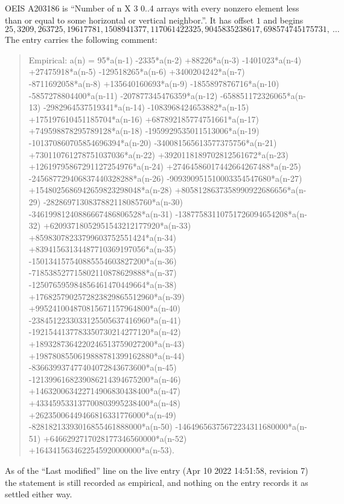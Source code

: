 \documentclass[11pt,a4paper]{article}
\theoremstyle{plain}
\theoremstyle{definition}
\begin{document}
OEIS A203186 is ``Number of n X 3 0..4 arrays with every nonzero element less than or equal to some horizontal or vertical neighbor.''. It has offset $1$ and begins
\[
25, 3209, 263725, 19617781, 1508941377, 117061422325, 9045835238617, 698574745175731,\ \dots
\]
The entry carries the following comment:
\begin{quote}\small
Empirical: a(n) = 95*a(n-1) -2335*a(n-2) +88226*a(n-3) -1401023*a(n-4) +27475918*a(n-5) -129518265*a(n-6) +3400204242*a(n-7) -8711692058*a(n-8) +135640160693*a(n-9) -1855897876716*a(n-10) -5857278804400*a(n-11) -207877345476359*a(n-12) -658851172326065*a(n-13) -2982964537519341*a(n-14) -1083968424653882*a(n-15) +175197610451185704*a(n-16) +687892185774751661*a(n-17) +749598878295789128*a(n-18) -1959929535011513006*a(n-19) -101370860705854696394*a(n-20) -340081565613577375756*a(n-21) +730110761278751037036*a(n-22) +3920118189702812561672*a(n-23) +12619795867291127254976*a(n-24) +27464586017442664267488*a(n-25) -245687729406837440328288*a(n-26) -909390951510003354547680*a(n-27) +1548025686942659823298048*a(n-28) +8058128637358990922686656*a(n-29) -2828697130837882118085760*a(n-30) -34619981240886667486806528*a(n-31) -13877583110751726094654208*a(n-32) +62093718052951543212177920*a(n-33) +85983078233799603752551424*a(n-34) +83941563134487710369197056*a(n-35) -150134157540885554603827200*a(n-36) -718538527715802110878629888*a(n-37) -125076595984856461470449664*a(n-38) +1768257902572823829865512960*a(n-39) +995241004870815671157964800*a(n-40) -2384512233033125505637416960*a(n-41) -1921544137783350730214277120*a(n-42) +1893287364220246513759027200*a(n-43) +1987808550619888781399162880*a(n-44) -836639937477404072843673600*a(n-45) -1213996168239086214394675200*a(n-46) +146320063422714906830438400*a(n-47) +433459533137700803995238400*a(n-48) +26235006449466816331776000*a(n-49) -82818213393016855461888000*a(n-50) -14649656375672234311680000*a(n-51) +6466292717028177346560000*a(n-52) +1643415634622545920000000*a(n-53).
\end{quote}
As of the ``Last modified'' line on the live entry (Apr 10 2022 14:51:58, revision 7) the statement is
still recorded as empirical, and nothing on the entry records it as settled either way.
\end{document}
